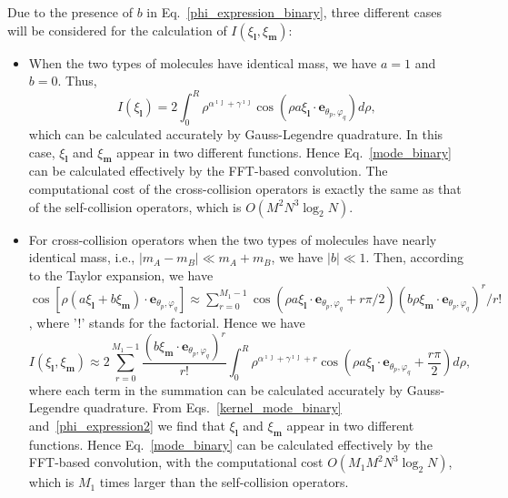 Due to the presence of $b$ in Eq.~\eqref{phi_expression_binary}, three different cases will be considered for the calculation of $I(\xi_\textbf{l},\xi_\textbf{m})$:
\begin{itemize}
    \item {When the two types of molecules have identical mass, we have
        $a=1$ and $b=0$. Thus,
        \begin{equation}
             I(\xi_\textbf{l})=2\int_{0}^R\rho^{\alpha^{\imath\jmath}+\gamma^{\imath\jmath}}\cos(\rho{}a\xi_\textbf{l}\cdot{\textbf{e}}_{\theta_p,\varphi_q})d\rho,
        \end{equation}
        which can be calculated accurately by Gauss-Legendre quadrature. In this case, $\xi_\textbf{l}$ and $\xi_\textbf{m}$ appear in two different functions. Hence Eq.~\eqref{mode_binary} can be calculated effectively by the FFT-based convolution. The computational cost of the cross-collision operators is exactly the same as that of the self-collision operators, which is $O(M^2N^3\log_2N)$.}
        
   \item {For cross-collision operators when the two types of molecules have nearly identical mass, i.e., $|m_A-m_B|\ll{m_A+m_B}$, we have $|b|\ll1$. Then, according to the Taylor expansion, we have         $\cos[\rho(a\xi_\textbf{l}+b\xi_\textbf{m})\cdot{\textbf{e}}_{\theta_p,\varphi_q}]\approx\sum_{r=0}^{M_1-1}  \cos(\rho{}a\xi_\textbf{l}\cdot{\textbf{e}}_{\theta_p,\varphi_q}+r\pi/2)(b\rho\xi_\textbf{m}\cdot{\textbf{e}}_{\theta_p,\varphi_q})^r/r!$, where '!' stands for the factorial. Hence we have
        \begin{equation}\label{phi_expression2}       I(\xi_\textbf{l},\xi_\textbf{m})\approx2\sum_{r=0}^{M_1-1}\frac{(b\xi_\textbf{m}\cdot{\textbf{e}}_{\theta_p,\varphi_q})^r}{r!}          \int_{0}^R\rho^{\alpha^{\imath\jmath}+\gamma^{\imath\jmath}+r}\cos\left(\rho{}a\xi_\textbf{l}\cdot{\textbf{e}}_{\theta_p,\varphi_q}+\frac{r\pi}{2}\right)d\rho,        
        \end{equation}
        where each term in the summation  can be calculated accurately by Gauss-Legendre quadrature. From Eqs.~\eqref{kernel_mode_binary} and~\eqref{phi_expression2} we find that $\xi_\textbf{l}$ and $\xi_\textbf{m}$ appear in two different functions. Hence Eq.~\eqref{mode_binary} can be calculated effectively by the FFT-based convolution, with the computational cost $O(M_1M^2N^3\log_2N)$, which is $M_1$ times larger than the self-collision operators. }
        

\end{itemize}
